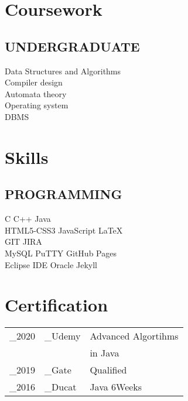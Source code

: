 \documentclass[]{deedy-resume-openfont}
\begin{document}
\begin{minipage}[t]{0.33\textwidth}
\sectionsep


\section{Coursework}
\subsection{UNDERGRADUATE}
Data Structures and Algorithms\\
Compiler design \\
Automata theory\\
Operating system\\
DBMS\\

\sectionsep


\section{Skills}
\subsection{PROGRAMMING}
C \textbullet{} C++ \textbullet{} Java \\
HTML5-CSS3 \textbullet{} JavaScript \textbullet{} \LaTeX\ \\
GIT \textbullet{} JIRA\\
MySQL \textbullet{} PuTTY \textbullet{} GitHub Pages\\
Eclipse IDE \textbullet{}Oracle\textbullet{} Jekyll

\sectionsep


\section{Certification}
\begin{tabular}{r l l}
_{2020} & _{Udemy} & Advanced Algortihms \\
& & in Java \\
_{2019} & _{Gate} & Qualified\\
_{2016} & _{Ducat} & Java 6Weeks
\end{tabular}

\sectionsep

%
%

\end{minipage} 
\end{document}

